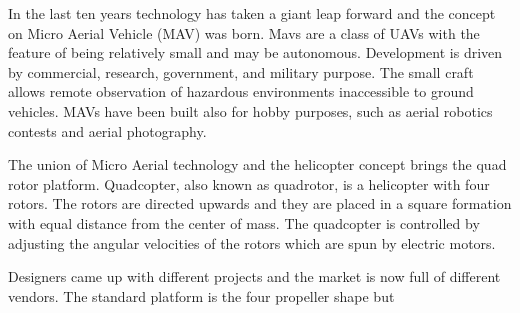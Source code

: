\noindent
In the last ten years technology has taken a giant leap forward and the concept on Micro Aerial Vehicle (MAV) was born. Mavs are a class of UAVs with the feature of being relatively small and may be autonomous. Development is driven by commercial, research, government, and military purpose. The small craft allows remote observation of hazardous environments inaccessible to ground vehicles. MAVs have been built also for hobby purposes, such as aerial robotics contests and aerial photography.\par The union of Micro Aerial technology and the helicopter concept brings the quad rotor platform. Quadcopter, also known as quadrotor, is a helicopter with four rotors. The rotors are directed upwards and they are placed in a square formation with equal distance from the center of mass. The quadcopter is controlled by adjusting the angular velocities of the rotors which are spun by electric motors.\par Designers came up with different projects and the market is now full of different vendors. The standard platform is the four propeller shape but

